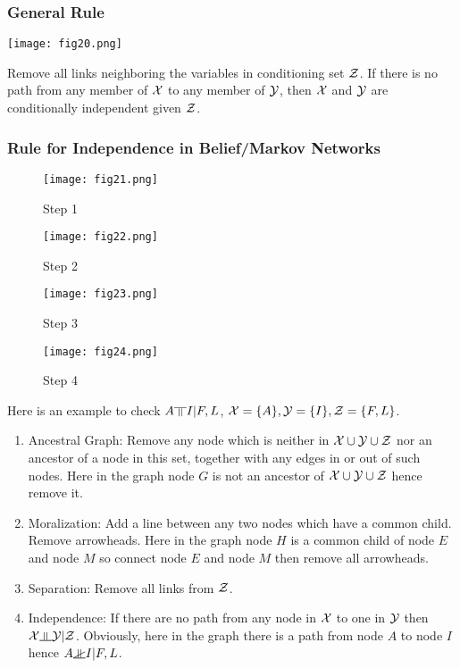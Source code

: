 \subsubsection*{General Rule}

\begin{figure*}[h]
	\centering
	\texttt{[image: fig20.png]}
\end{figure*}
Remove all links neighboring the variables in conditioning set $\mathcal{Z}$. If there is no path from any member of $\mathcal{X}$ to any member of $\mathcal{Y}$, then $\mathcal{X}$ and $\mathcal{Y}$ are conditionally independent given $\mathcal{Z}$.

\subsubsection*{Rule for Independence in Belief/Markov Networks}

\begin{figure*}[h]
	\centering
	\begin{subfigure}[b]{0.24\textwidth}
		\centering
		\texttt{[image: fig21.png]}
		\caption*{Step 1}
	\end{subfigure}
	\begin{subfigure}[b]{0.24\textwidth}
		\centering
		\texttt{[image: fig22.png]}
		\caption*{Step 2}
	\end{subfigure}
	\begin{subfigure}[b]{0.24\textwidth}
		\centering
		\texttt{[image: fig23.png]}
		\caption*{Step 3}
	\end{subfigure}
	\begin{subfigure}[b]{0.24\textwidth}
		\centering
		\texttt{[image: fig24.png]}
		\caption*{Step 4}
	\end{subfigure}
\end{figure*}
Here is an example to check $A\dep I|F,L$, $\mathcal{X}=\{A\},\mathcal{Y}=\{I\},\mathcal{Z}=\{F,L\}$.
\begin{enumerate}
	\item Ancestral Graph: Remove any node which is neither in $\mathcal{X}\cup\mathcal{Y}\cup\mathcal{Z}$ nor an ancestor of a node in this set, together with any edges in or out of such nodes. Here in the graph node $G$ is not an ancestor of $\mathcal{X}\cup\mathcal{Y}\cup\mathcal{Z}$ hence remove it.
	\item Moralization: Add a line between any two nodes which have a common child. Remove arrowheads. Here in the graph node $H$ is a common child of node $E$ and node $M$ so connect node $E$ and node $M$ then remove all arrowheads.
	\item Separation: Remove all links from $\mathcal{Z}$.
	\item Independence: If there are no path from any node in $\mathcal{X}$ to one in $\mathcal{Y}$ then $\cX\indep\cY|\cZ$. Obviously, here in the graph there is a path from node $A$ to node $I$ hence $A\nindep I|F,L$.
\end{enumerate}

